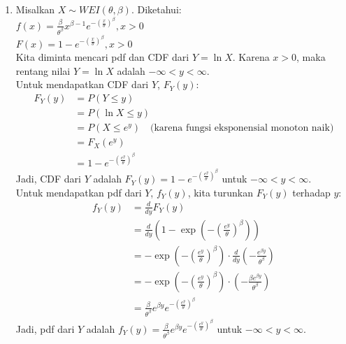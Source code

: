 \documentclass[11pt,letterpaper]{article}
\begin{document}
\begin{enumerate}
  \item Misalkan $X \sim WEI(\theta, \beta)$. Diketahui: \\
        $f(x) = \frac{\beta}{\theta^\beta} x^{\beta-1} e^{-\left(\frac{x}{\theta}\right)^\beta}, x > 0$ \\
        $F(x) = 1 - e^{-\left(\frac{x}{\theta}\right)^\beta}, x > 0$ \\
        Kita diminta mencari pdf dan CDF dari $Y = \ln X$.
        Karena $x > 0$, maka rentang nilai $Y = \ln X$ adalah $-\infty < y < \infty$. \\
        Untuk mendapatkan CDF dari $Y$, $F_Y(y)$:
        \begin{align*}
          F_Y(y) & = P(Y \le y)                                                          \\
                 & = P(\ln X \le y)                                                      \\
                 & = P(X \le e^y) \quad \text{(karena fungsi eksponensial monoton naik)} \\
                 & = F_X(e^y)                                                            \\
                 & = 1 - e^{-\left(\frac{e^y}{\theta}\right)^\beta}
        \end{align*}
        Jadi, CDF dari $Y$ adalah $F_Y(y) = 1 - e^{-\left(\frac{e^y}{\theta}\right)^\beta}$ untuk $-\infty < y < \infty$. \\
        Untuk mendapatkan pdf dari $Y$, $f_Y(y)$, kita turunkan $F_Y(y)$ terhadap $y$:
        \begin{align*}
          f_Y(y) & = \frac{d}{dy} F_Y(y)                                                                                                         \\
                 & = \frac{d}{dy} \left( 1 - \exp\left(-\left(\frac{e^y}{\theta}\right)^\beta\right) \right)                                     \\
                 & = - \exp\left(-\left(\frac{e^y}{\theta}\right)^\beta\right) \cdot \frac{d}{dy} \left(-\frac{e^{\beta y}}{\theta^\beta}\right) \\
                 & = - \exp\left(-\left(\frac{e^y}{\theta}\right)^\beta\right) \cdot \left(-\frac{\beta e^{\beta y}}{\theta^\beta}\right)        \\
                 & = \frac{\beta}{\theta^\beta} e^{\beta y} e^{-\left(\frac{e^y}{\theta}\right)^\beta}
        \end{align*}
        Jadi, pdf dari $Y$ adalah $f_Y(y) = \frac{\beta}{\theta^\beta} e^{\beta y} e^{-\left(\frac{e^y}{\theta}\right)^\beta}$ untuk $-\infty < y < \infty$.


\end{enumerate}
\end{document}
